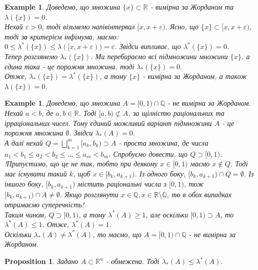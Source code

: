 \documentclass[a4paper, 10pt]{article}
\def\huge{\displaystyle}
\theoremstyle{theoremdd}
\theoremstyle{theoremdd}
\theoremstyle{theoremdd}
\theoremstyle{theoremdd}
\newtheorem{example}[theorem]{Example}
\theoremstyle{theoremdd}
\newtheorem{proposition}[theorem]{Proposition}
\theoremstyle{theoremdd}
\theoremstyle{theoremdd}
\theoremstyle{theoremdd}
\begin{document}
\begin{example}
Доведемо, що множина $\{x\} \subset \mathbb{R}$ - вимірна за Жорданом та $\lambda(\{x\}) = 0$.\\
Нехай $\varepsilon > 0$, тоді візьмемо напівінтервал $[x,x+\varepsilon)$. Ясно, що $\{x\} \subset [x,x+\varepsilon)$, тоді за критерієм інфімума, маємо:\\
$0 \leq \lambda^*(\{x\}) \leq \lambda([x,x+\varepsilon)) = \varepsilon$. Звідси випливає, що $\lambda^*(\{x\}) = 0$.\\
Тепер розглянемо $\lambda_*(\{x\})$. Ми перебираємо всі підмножини множини $\{x\}$, а єдина така - це порожня множина, тоді $\lambda_*(\{x\}) = 0$.\\
Отже, $\lambda_*(\{x\}) = \lambda^*(\{x\})$, а тому $\{x\}$ - вимірна за Жорданом, а також $\lambda(\{x\}) = 0$.
\end{example}

\begin{example}
Доведемо, що множина $A =[0,1) \cap \mathbb{Q}$ - не вимірна за Жорданом.\\
Нехай $a<b$, де $a,b \in \mathbb{R}$. Тоді $[a,b) \not\subset A$, за щілністю раціональних та ірраціональних чисел. Тому єдиний можливий варіант підмножини $A$ - це порожня множина $\emptyset$. Звідси $\lambda_*(A) = 0$.\\
А далі нехай $Q = \huge\bigsqcup_{k=1}^m [a_k,b_k) \supset A$ - проста множина, де числа $a_1 < b_1 \leq a_2 < b_2 \leq \dots \leq a_m < b_m$. Спробуємо довести, що $Q \supset [0,1)$.\\
!Припустимо, що це не так, тобто при деякому $x \in [0,1)$ маємо $x \not \in Q$. Тоді має існувати такий $k$, щоб $x \in [b_k,a_{k+1})$. Із одного боку, $[b_k,a_{k+1}) \cap Q = \emptyset$. Із іншого боку, $[b_k,a_{k+1})$ містить раціональні числа з $[0,1)$, тож $[b_k,a_{k+1}) \cap A \neq \emptyset$. Якщо розглянути $x \in \mathbb{Q}, x \in \mathbb{R} \setminus \mathbb{Q}$, то в обох випадках отримаємо суперечність!\\
Таким чином, $Q \supset [0,1)$, а тому $\lambda^*(A) \geq 1$, але оскільки $[0,1) \supset A$, то $\lambda^*(A) \leq 1$. Отже, $\lambda^*(A) = 1$.\\
Оскільки $\lambda_*(A) \neq \lambda^*(A)$, то маємо, що $A = [0,1) \cap \mathbb{Q}$ - не вимірна за Жорданом.
\end{example}

\begin{proposition}
Задано $A \subset \mathbb{R}^n$ - обмежена. Тоді $\lambda_*(A) \leq \lambda^*(A)$.
\end{proposition}
\end{document}
